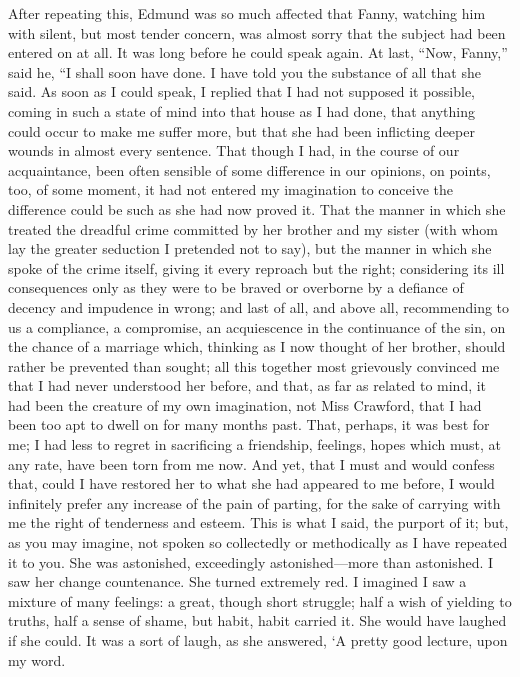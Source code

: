 \documentclass{article}
\begin{document}
After repeating this, Edmund was so much affected that Fanny,
watching him with silent, but most tender concern,
was almost sorry that the subject had been entered
on at all.  It was long before he could speak again.
At last, ``Now, Fanny,'' said he, ``I shall soon have done.
I have told you the substance of all that she said.
As soon as I could speak, I replied that I had not
supposed it possible, coming in such a state of mind
into that house as I had done, that anything could
occur to make me suffer more, but that she had been
inflicting deeper wounds in almost every sentence.
That though I had, in the course of our acquaintance,
been often sensible of some difference in our opinions,
on points, too, of some moment, it had not entered my
imagination to conceive the difference could be such as she
had now proved it.  That the manner in which she treated
the dreadful crime committed by her brother and my sister
(with whom lay the greater seduction I pretended not to say),
but the manner in which she spoke of the crime itself,
giving it every reproach but the right; considering its ill
consequences only as they were to be braved or overborne
by a defiance of decency and impudence in wrong; and last
of all, and above all, recommending to us a compliance,
a compromise, an acquiescence in the continuance of the sin,
on the chance of a marriage which, thinking as I now thought
of her brother, should rather be prevented than sought;
all this together most grievously convinced me that I had
never understood her before, and that, as far as related
to mind, it had been the creature of my own imagination,
not Miss Crawford, that I had been too apt to dwell on
for many months past.  That, perhaps, it was best for me;
I had less to regret in sacrificing a friendship, feelings,
hopes which must, at any rate, have been torn from me now.
And yet, that I must and would confess that, could I
have restored her to what she had appeared to me before,
I would infinitely prefer any increase of the pain
of parting, for the sake of carrying with me the right of
tenderness and esteem.  This is what I said, the purport
of it; but, as you may imagine, not spoken so collectedly
or methodically as I have repeated it to you.  She was
astonished, exceedingly astonished---more than astonished.
I saw her change countenance.  She turned extremely red.
I imagined I saw a mixture of many feelings:  a great,
though short struggle; half a wish of yielding to truths,
half a sense of shame, but habit, habit carried it.
She would have laughed if she could.  It was a sort of laugh,
as she answered, `A pretty good lecture, upon my word.
\end{document}
